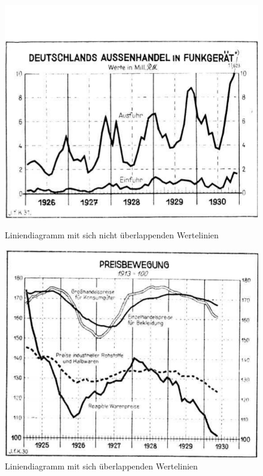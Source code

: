 \begin{figure}[h!]
    \vspace{0.75em}

    \begin{minipage}{0.475\textwidth} %
        \centering
        \includegraphics[width=\linewidth]{Methodik/img/linebank_non_overlapping.png}
        \caption{ Liniendiagramm mit sich nicht überlappenden Wertelinien}
        \label{fig:linebank_non_overlapping}
    \end{minipage}\hfill %
    \begin{minipage}{0.475\textwidth} %
        \centering
        \includegraphics[width=\linewidth]{Methodik/img/linebank_overlapping.png}
        \caption{ Liniendiagramm mit sich überlappenden Wertelinien}
        \label{fig:linebank_overlapping}
    \end{minipage}
\end{figure}
